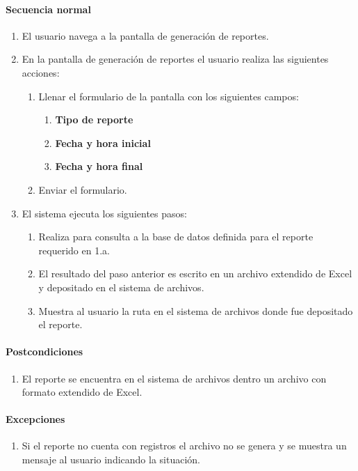 \paragraph*{Secuencia normal}
\begin{enumerate}
  \item El usuario navega a la pantalla de generación de reportes.
  \item En la pantalla de generación de reportes el usuario realiza las siguientes acciones:
    \begin{enumerate}
    \item Llenar el formulario de la pantalla con los siguientes campos:
    \begin{enumerate}
      \item \textbf{Tipo de reporte}
      \item \textbf{Fecha y hora inicial}
      \item \textbf{Fecha y hora final}
    \end{enumerate}
    \item Enviar el formulario.
  \end{enumerate}
  \item El sistema ejecuta los siguientes pasos:
  \begin{enumerate}
    \item Realiza para consulta a la base de datos definida para el reporte requerido en 1.a.
    \item El resultado del paso anterior es escrito en un archivo extendido de Excel y depositado en el sistema de archivos.
    \item Muestra al usuario la ruta en el sistema de archivos donde fue depositado el reporte.
  \end{enumerate}
\end{enumerate}
\paragraph*{Postcondiciones}
\begin{enumerate}
  \item El reporte se encuentra en el sistema de archivos dentro un archivo con formato extendido de Excel.
\end{enumerate}
\paragraph*{Excepciones}
\begin{enumerate}
  \item Si el reporte no cuenta con registros el archivo no se genera y se muestra un mensaje al usuario indicando la situación.
\end{enumerate}


